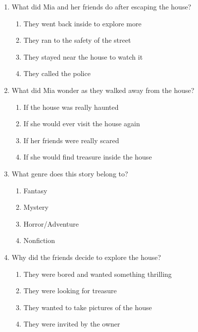 \documentclass[12pt]{article}
\begin{document}
\begin{enumerate}
    \vspace{0.5cm}

    \item What did Mia and her friends do after escaping the house?

    \begin{enumerate}[label=\Alph*.]
        \item They went back inside to explore more
        \item They ran to the safety of the street
        \item They stayed near the house to watch it
        \item They called the police
    \end{enumerate}
    
    \vspace{0.5cm}

    \item What did Mia wonder as they walked away from the house?

    \begin{enumerate}[label=\Alph*.]
        \item If the house was really haunted
        \item If she would ever visit the house again
        \item If her friends were really scared
        \item If she would find treasure inside the house
    \end{enumerate}
    
    \vspace{0.5cm}

    \item What genre does this story belong to?

    \begin{enumerate}[label=\Alph*.]
        \item Fantasy
        \item Mystery
        \item Horror/Adventure
        \item Nonfiction
    \end{enumerate}
    
    \vspace{0.5cm}

    \item Why did the friends decide to explore the house?

    \begin{enumerate}[label=\Alph*.]
        \item They were bored and wanted something thrilling
        \item They were looking for treasure
        \item They wanted to take pictures of the house
        \item They were invited by the owner
    \end{enumerate}

\end{enumerate}
\end{document}

